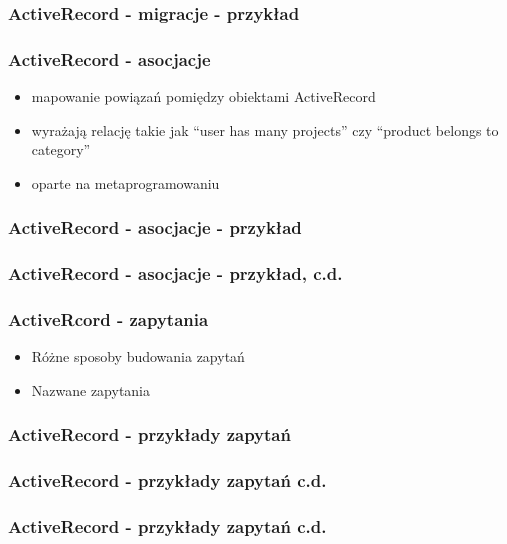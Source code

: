 \documentclass[12t]{beamer}
\begin{document}
\begin{frame}[fragile]
  \frametitle{ActiveRecord - migracje - przykład}
  
\end{frame}

\begin{frame}
  \frametitle{ActiveRecord - asocjacje}
  \begin{itemize}
  \item mapowanie powiązań pomiędzy obiektami ActiveRecord
  \item wyrażają relację takie jak “user has many projects” czy
    “product belongs to category”
  \item oparte na metaprogramowaniu
  \end{itemize}
\end{frame}

\begin{frame}[fragile]
  \frametitle{ActiveRecord - asocjacje - przykład}
  
\end{frame}

\begin{frame}[fragile]
  \frametitle{ActiveRecord - asocjacje - przykład, c.d.}
  
\end{frame}

\begin{frame}
  \frametitle{ActiveRcord - zapytania}
  \begin{itemize}
  \item Różne sposoby budowania zapytań
  \item Nazwane zapytania
  \end{itemize}
\end{frame}

\begin{frame}[fragile]
  \frametitle{ActiveRecord - przykłady zapytań}
  \begin{footnotesize}
    
  \end{footnotesize}
\end{frame}

\begin{frame}[fragile]
  \frametitle{ActiveRecord - przykłady zapytań c.d.}
  \begin{footnotesize}
    
  \end{footnotesize}
\end{frame}

\begin{frame}[fragile]
  \frametitle{ActiveRecord - przykłady zapytań c.d.}
  \begin{small}
    
  \end{small}
\end{frame}
\end{document}
